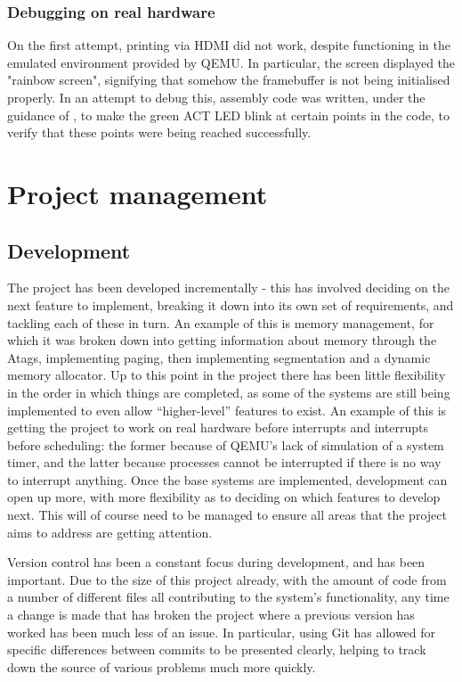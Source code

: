 \documentclass[10pt,a4paper]{article}
\begin{document}
\subsubsection*{Debugging on real hardware}
On the first attempt, printing via HDMI did not work, despite functioning in the
emulated environment provided by QEMU. In particular, the screen displayed the
"rainbow screen", signifying that somehow the framebuffer is not being
initialised properly. In an attempt to debug this, assembly code was written,
under the guidance of \cite{BakingPi}, to make the green ACT LED blink at
certain points in the code, to verify that these points were being reached
successfully.

\section*{Project management}
\subsection*{Development}
The project has been developed incrementally - this has involved deciding on the
next feature to implement, breaking it down into its own set of requirements,
and tackling each of these in turn. An example of this is memory management, for
which it was broken down into getting information about memory through the
Atags, implementing paging, then implementing segmentation and a dynamic memory
allocator. Up to this point in the project there has been little flexibility
in the order in which things are completed, as some of the systems are still
being implemented to even allow ``higher-level'' features to exist. An example of
this is getting the project to work on real hardware before interrupts and
interrupts before scheduling: the former because of QEMU's lack of simulation of a
system timer, and the latter because processes cannot be interrupted if there is
no way to interrupt anything. Once the base systems are implemented, development
can open up more, with more flexibility as to deciding on which features to
develop next. This will of course need to be managed to ensure all areas that
the project aims to address are getting attention.

Version control has been a constant focus during development, and has been
important. Due to the size of this project already, with the amount of code from
a number of different files all contributing to the system's functionality, any
time a change is made that has broken the project where a previous version has
worked has been much less of an issue. In particular, using Git has allowed for
specific differences between commits to be presented clearly, helping to track
down the source of various problems much more quickly.
\end{document}

